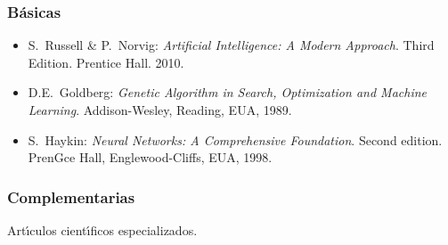\documentclass[10 pt]{article}
\begin{document}
\subsubsection{B\'{a}sicas}

\begin{itemize}[itemsep=0em]
  
\item{S.\ {\sc Russell} \& P.\ {\sc Norvig}: {\em Artificial Intelligence: A Modern Approach}. Third Edition. Prentice Hall. 2010.}

\item{D.E.\ {\sc Goldberg}: {\em Genetic Algorithm in Search, Optimization and Machine Learning}. Addison-Wesley, Reading, EUA, 1989.}

\item{S.\ {\sc Haykin}: {\em Neural Networks: A Comprehensive Foundation}. Second edition. PrenGce Hall, Englewood-Cliffs, EUA, 1998.}

\end{itemize}

\subsubsection{Complementarias}

Art\'{\i}culos cient\'{\i}ficos especializados.

\label{final} %


\end{document}
